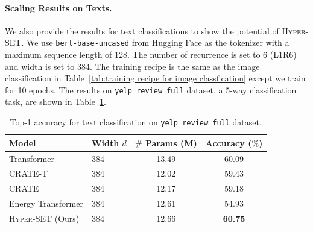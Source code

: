 \paragraph{Scaling Results on Texts.} We also provide the results for text classifications to show the potential of \textsc{Hyper-SET}. We use \texttt{bert-base-uncased} from Hugging Face as the tokenizer with a maximum sequence length of 128. The number of recurrence is set to 6 (L1R6) and width 
 is set to 384. The training recipe is the same as the image classification in Table~\ref{tab:training recipe for image classfication} except we train for 10 epochs. The results on \texttt{yelp\_review\_full} dataset, a 5-way classification task, are shown in Table~\ref{tab:text clasification}.
 \begin{table}[htbp]
\caption{Top-1 accuracy for text classification on \texttt{yelp\_review\_full} dataset.}
\label{tab:text clasification}
\centering
\begin{tabular}{llcc}
\toprule
\textbf{Model} & \textbf{Width} $d$ & \textbf{$\#$ Params (M)}& \textbf{Accuracy ($\%$)} \\
\midrule
Transformer & 384 & 13.49 	& 60.09 \\
\textsc{CRATE}-T \citep{hu2024an} & 384 & 12.02 & 59.43 \\
\textsc{CRATE} \citep{yu2023white} & 384 & 12.17  & 59.18 \\
Energy Transformer \citep{hoover2024energy} & 384 & 12.61  & 54.93 \\
\textsc{Hyper-SET} (Ours) & 384 & 12.66 & \textbf{60.75} \\
\bottomrule
\end{tabular}
\end{table}